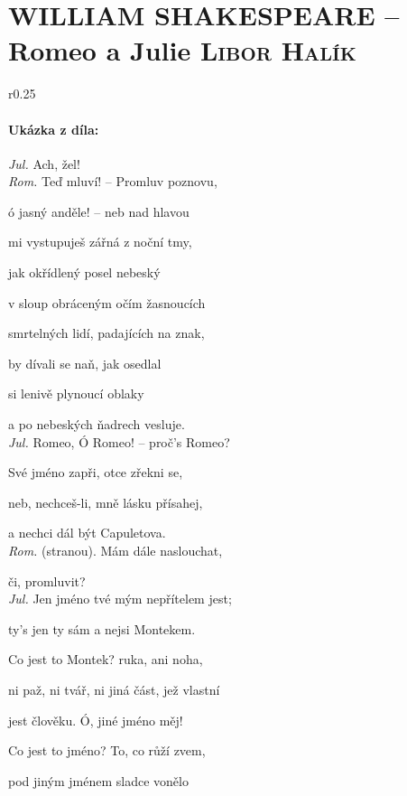 \documentclass[A4paper]{extarticle} %
\begin{document}
\newpage


\changefontsize{8pt}

\part*{WILLIAM SHAKESPEARE -- Romeo a Julie {\hfill \normalfont\tiny\textsc{Libor Halík}}}

\noindent\begin{wrapfigure}{r}{0.25\textwidth}
\tiny

\subsection*{Ukázka z díla:}
\setlength{\parindent}{3pt}
\noindent \textit{Jul.} Ach, žel! \\
\textit{Rom.} Teď mluví! -- Promluv poznovu, \par
ó jasný anděle! -- neb nad hlavou \par
mi vystupuješ zářná z noční tmy, \par
jak okřídlený posel nebeský \par
v sloup obráceným očím žasnoucích \par
smrtelných lidí, padajících na znak, \par
by dívali se naň, jak osedlal \par
si lenivě plynoucí oblaky \par
a po nebeských ňadrech vesluje. \\
\textit{Jul.} Romeo, Ó Romeo! -- proč's Romeo? \par
Své jméno zapři, otce zřekni se, \par
neb, nechceš-li, mně lásku přísahej, \par
a nechci dál být Capuletova. \\
\textit{Rom.} (stranou). Mám dále naslouchat, \par 
či, promluvit? \\
\textit{Jul.} Jen jméno tvé mým nepřítelem jest; \par
ty's jen ty sám a nejsi Montekem. \par
Co jest to Montek? ruka, ani noha, \par
ni paž, ni tvář, ni jiná část, jež vlastní \par
jest člověku. Ó, jiné jméno měj! \par
Co jest to jméno? To, co růží zvem, \par
pod jiným jménem sladce vonělo \par

\end{wrapfigure}
\end{document}

